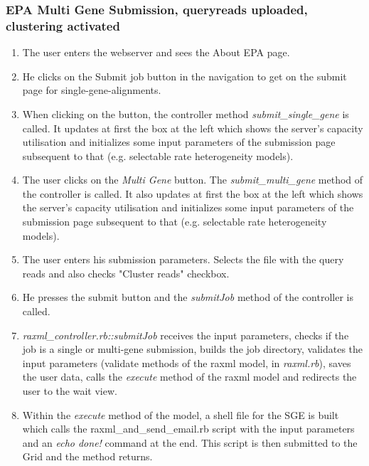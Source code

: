 \documentclass{scrartcl}
\begin{document}
			\subsubsection{EPA Multi Gene Submission, queryreads uploaded, clustering activated}
				\begin{enumerate}
					\item The user enters the webserver and sees the About EPA page.
					\item He clicks on the Submit job button in the navigation to get on the submit page for single-gene-alignments.
					\item When clicking on the button, the controller method \textit{submit\_single\_gene} is called. It updates at first the box at the left which shows the server's capacity utilisation and initializes some input parameters of the submission page subsequent to that (e.g. selectable rate heterogeneity models).
					\item The user clicks on the \textit{Multi Gene} button. The \textit{submit\_multi\_gene} method of the controller is called. It also updates at first the box at the left which shows the server's capacity utilisation and initializes some input parameters of the submission page subsequent to that (e.g. selectable rate heterogeneity models).
					\item The user enters his submission parameters. Selects the file with the query reads and also checks "Cluster reads" checkbox.
					\item He presses the submit button and the \textit{submitJob} method of the controller is called.
					\item \textit{raxml\_controller.rb::submitJob} receives the input parameters, checks if the job is a single or multi-gene submission, builds the job directory, validates the input parameters (validate methods of the raxml model, in \textit{raxml.rb}), saves the user data, calls the \textit{execute} method of the raxml model and redirects the user to the wait view.
					\item Within the \textit{execute} method of the model, a shell file for the SGE is built which calls the raxml\_and\_send\_email.rb script with the input parameters and an \textit{echo done!} command at the end. This script is then submitted to the Grid and the method returns.

\end{enumerate}
\end{document}
